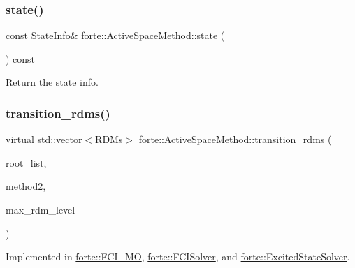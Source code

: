 \subsubsection{\texorpdfstring{state()}{state()}}
{\footnotesize\ttfamily const \mbox{\hyperlink{classforte_1_1_state_info}{State\+Info}}\& forte\+::\+Active\+Space\+Method\+::state (\begin{DoxyParamCaption}{ }\end{DoxyParamCaption}) const\hspace{0.3cm}{\ttfamily [inline]}}



Return the state info. 

\mbox{\label{classforte_1_1_active_space_method_a4460069915e56a1994d3a4a4e78bdb30}} 
\subsubsection{\texorpdfstring{transition\+\_\+rdms()}{transition\_rdms()}}
{\footnotesize\ttfamily virtual std\+::vector$<$\mbox{\hyperlink{classforte_1_1_r_d_ms}{R\+D\+Ms}}$>$ forte\+::\+Active\+Space\+Method\+::transition\+\_\+rdms (\begin{DoxyParamCaption}\item[{const std\+::vector$<$ std\+::pair$<$ size\+\_\+t, size\+\_\+t $>$$>$ \&}]{root\+\_\+list,  }\item[{std\+::shared\+\_\+ptr$<$ \mbox{\hyperlink{classforte_1_1_active_space_method}{Active\+Space\+Method}} $>$}]{method2,  }\item[{int}]{max\+\_\+rdm\+\_\+level }\end{DoxyParamCaption})\hspace{0.3cm}{\ttfamily [pure virtual]}}



Implemented in \mbox{\hyperlink{classforte_1_1_f_c_i___m_o_a62d0c9bbee3dc8942ab109354074ad87}{forte\+::\+F\+C\+I\+\_\+\+MO}}, \mbox{\hyperlink{classforte_1_1_f_c_i_solver_ad29797ad91b7edb6b3d8a4c66aaf18a0}{forte\+::\+F\+C\+I\+Solver}}, and \mbox{\hyperlink{classforte_1_1_excited_state_solver_a8fa122b902c65b75470e34cdd475acaf}{forte\+::\+Excited\+State\+Solver}}.



